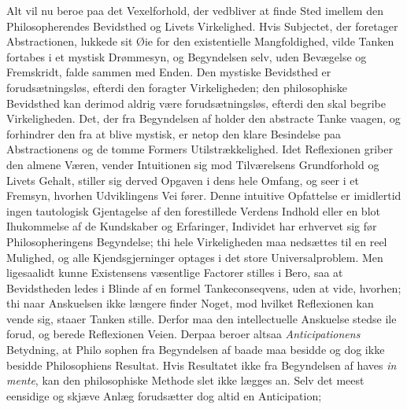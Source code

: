 \documentclass[12pt]{book}
\newcommand{\opage}[1]{\marginnote{\footnotesize\textit{[#1]}}}
\begin{document}
Alt vil nu beroe paa det Vexelforhold, der vedbliver at finde Sted imellem den Philosopherendes
Bevidsthed og Livets Virkelighed. Hvis Subjectet, der foretager Abstractionen, lukkede sit Øie
for den existentielle Mangfoldighed, vilde Tanken fortabes i et mystisk Drømmesyn, og
Begyndelsen selv, uden Bevægelse og Fremskridt, falde sammen med Enden. Den mystiske Bevidsthed
er forudsætningsløs, efterdi den foragter Virkeligheden; den philosophiske Bevidsthed kan
derimod aldrig være forudsætningsløs, efterdi den skal begribe Virkeligheden. Det, der fra
Begyndelsen af holder den abstracte Tanke vaagen, og forhindrer den fra at blive mystisk, er
netop den klare Besindelse paa Abstractionens og de tomme Formers Utilstrækkelighed. Idet
Reflexionen griber den almene Væren, vender Intuitionen sig mod Tilværelsens Grundforhold og
Livets Gehalt, stiller sig derved Opgaven i dens hele Omfang, og seer i et Fremsyn, hvorhen
Udviklingens Vei fører. Denne intuitive Opfattelse er imidlertid ingen tautologisk Gjentagelse
af den forestillede Verdens Indhold eller en blot Ihukommelse af de Kundskaber og Erfaringer,
Individet har erhvervet sig før Philosopheringens Begyndelse; thi hele Virkeligheden maa
nedsættes til en reel Mulighed, og alle Kjendsgjerninger optages i det store Universalproblem.
Men ligesaalidt kunne Existensens væsentlige Factorer stilles i Bero, saa at Bevidstheden ledes
i Blinde af en formel Tankeconseqvens, uden at vide, hvorhen; thi naar Anskuelsen ikke længere
finder Noget, mod hvilket Reflexionen kan vende sig, staaer Tanken stille. Derfor maa den
intellectuelle Anskuelse stedse ile forud, og berede Reflexionen Veien. Derpaa beroer altsaa
\emph{Anticipationens} Betydning, at Philo%
\opage{105}%
sophen fra Begyndelsen af baade maa besidde og dog ikke besidde Philosophiens Resultat. Hvis
Resultatet ikke fra Begyndelsen af haves \textit{in mente}, kan den philosophiske Methode slet
ikke lægges an. Selv det meest eensidige og skjæve Anlæg forudsætter dog altid en Anticipation;
\end{document}
